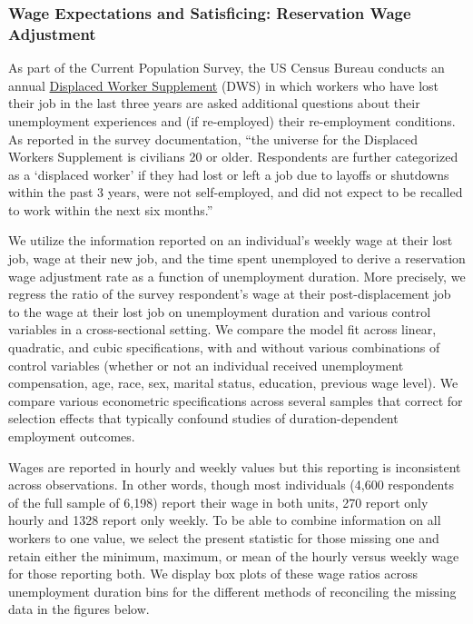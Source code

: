 \documentclass[
]{article}
\begin{document}
\subsubsection{Wage Expectations and Satisficing: Reservation Wage
Adjustment}\label{wage-expectations-and-satisficing-reservation-wage-adjustment}

As part of the Current Population Survey, the US Census Bureau conducts
an annual
\href{https://cps.ipums.org/cps/dw_sample_notes.shtml}{Displaced Worker
Supplement} (DWS) in which workers who have lost their job in the last
three years are asked additional questions about their unemployment
experiences and (if re-employed) their re-employment conditions. As
reported in the survey documentation, ``the universe for the Displaced
Workers Supplement is civilians 20 or older. Respondents are further
categorized as a `displaced worker' if they had lost or left a job due
to layoffs or shutdowns within the past 3 years, were not self-employed,
and did not expect to be recalled to work within the next six months.''

We utilize the information reported on an individual's weekly wage at
their lost job, wage at their new job, and the time spent unemployed to
derive a reservation wage adjustment rate as a function of unemployment
duration. More precisely, we regress the ratio of the survey
respondent's wage at their post-displacement job to the wage at their
lost job on unemployment duration and various control variables in a
cross-sectional setting. We compare the model fit across linear,
quadratic, and cubic specifications, with and without various
combinations of control variables (whether or not an individual received
unemployment compensation, age, race, sex, marital status, education,
previous wage level). We compare various econometric specifications
across several samples that correct for selection effects that typically
confound studies of duration-dependent employment outcomes.

Wages are reported in hourly and weekly values but this reporting is
inconsistent across observations. In other words, though most
individuals (4,600 respondents of the full sample of 6,198) report their
wage in both units, 270 report only hourly and 1328 report only weekly.
To be able to combine information on all workers to one value, we select
the present statistic for those missing one and retain either the
minimum, maximum, or mean of the hourly versus weekly wage for those
reporting both. We display box plots of these wage ratios across
unemployment duration bins for the different methods of reconciling the
missing data in the figures below.
\end{document}
